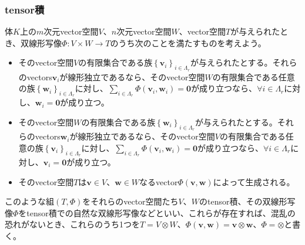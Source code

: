 \documentclass[dvipdfmx]{jsarticle}
\begin{document}
\subsubsection{tensor積}%
\begin{axs}
体$K$上の$m$次元vector空間$V$、$n$次元vector空間$W$、vector空間$T$が与えられたとき、双線形写像$\varPhi:V \times W \rightarrow T$のうち次のことを満たすものを考えよう。
\begin{itemize}
\item
  そのvector空間$V$の有限集合である族$\left\{ \mathbf{v}_{i} \right\}_{i \in \varLambda_{r}}$が与えられたとする。それらのvectors$\mathbf{v}_{i}$が線形独立であるなら、そのvector空間$W$の有限集合である任意の族$\left\{ \mathbf{w}_{i} \right\}_{i \in \varLambda_{r}}$に対し、$\sum_{i \in \varLambda_{r}} {\varPhi\left( \mathbf{v}_{i},\mathbf{w}_{i} \right)} = \mathbf{0}$が成り立つなら、$\forall i \in \varLambda_{r}$に対し、$\mathbf{w}_{i} = \mathbf{0}$が成り立つ。
\item
  そのvector空間$W$の有限集合である族$\left\{ \mathbf{w}_{i} \right\}_{i \in \varLambda_{r}}$が与えられたとする。それらのvectors$\mathbf{w}_{i}$が線形独立であるなら、そのvector空間$V$の有限集合である任意の族$\left\{ \mathbf{v}_{i} \right\}_{i \in \varLambda_{r}}$に対し、$\sum_{i \in \varLambda_{r}} {\varPhi\left( \mathbf{v}_{i},\mathbf{w}_{i} \right)} = \mathbf{0}$が成り立つなら、$\forall i \in \varLambda_{r}$に対し、$\mathbf{v}_{i} = \mathbf{0}$が成り立つ。
\item
  そのvector空間$T$は$\mathbf{v} \in V$、$\mathbf{w} \in W$なるvector$\varPhi\left( \mathbf{v},\mathbf{w} \right)$によって生成される。
\end{itemize}
このような組$(T,\varPhi)$をそれらのvector空間たち$V$、$W$のtensor積、その双線形写像$\varPhi$をtensor積での自然な双線形写像などといい、これらが存在すれば、混乱の恐れがないとき、これらのうち1つを$T = V \otimes W$、$\varPhi\left( \mathbf{v},\mathbf{w} \right) = \mathbf{v} \otimes \mathbf{w}$、$\varPhi = \otimes$と書く。
\end{axs}
\end{document}
